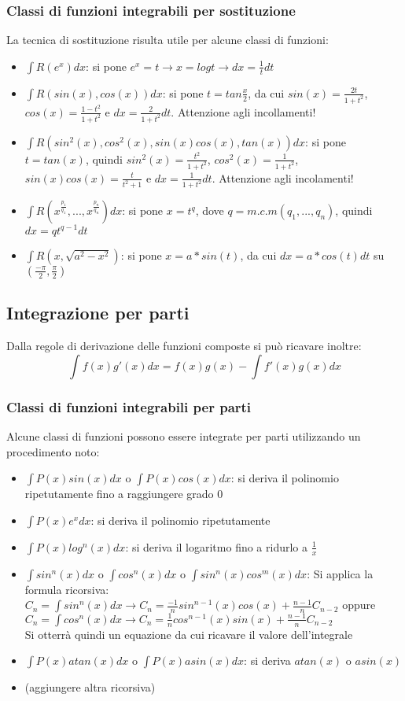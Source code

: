 \documentclass{article}
\begin{document}
\subsubsection{Classi di funzioni integrabili per sostituzione}
La tecnica di sostituzione risulta utile per alcune classi di funzioni:
\begin{itemize}
    \item $\int R(e^x)dx$: si pone $e^x=t\rightarrow x=logt\rightarrow dx=\frac{1}{t}dt$
    \item $\int R(sin(x), cos(x))dx$: si pone $t=tan\frac{x}{2}$, da cui $sin(x)=\frac{2t}{1+t^2}$, $cos(x)=\frac{1-t^2}{1+t^2}$ e $dx=\frac{2}{1+t^2}dt$. Attenzione agli incollamenti!
    \item $\int R(sin^2(x), cos^2(x), sin(x)cos(x), tan(x))dx$: si pone $t=tan(x)$, quindi $sin^2(x)=\frac{t^2}{1+t^2}$, $cos^2(x)=\frac{1}{1+t^2}$, $sin(x)cos(x)=\frac{t}{t^2+1}$ e $dx=\frac{1}{1+t^2}dt$. Attenzione agli incolamenti!
    \item $\int R(x^{\frac{p_1}{q_1}},...,x^{\frac{p_n}{q_n}})dx$: si pone $x=t^q$, dove $q=m.c.m(q_1,...,q_n)$, quindi $dx=qt^{q-1}dt$
    \item $\int R(x, \sqrt{a^2-x^2})$: si pone $x=a*sin(t)$, da cui $dx=a*cos(t)dt$ su $(\frac{-\pi}{2}, \frac{\pi}{2})$
\end{itemize}

\subsection{Integrazione per parti}
Dalla regole di derivazione delle funzioni composte si può ricavare inoltre:
$$\int f(x)g'(x)dx=f(x)g(x)-\int f'(x)g(x)dx$$

\subsubsection{Classi di funzioni integrabili per parti}
Alcune classi di funzioni possono essere integrate per parti utilizzando un procedimento noto:
\begin{itemize}
    \item $\int P(x)sin(x)dx$ o $\int P(x)cos(x)dx$: si deriva il polinomio ripetutamente fino a raggiungere grado 0
    \item $\int P(x)e^xdx$: si deriva il polinomio ripetutamente
    \item $\int P(x)log^n(x)dx$: si deriva il logaritmo fino a ridurlo a $\frac{1}{x}$
    \item $\int sin^n(x)dx$ o $\int cos^n(x)dx$ o $\int sin^n(x)cos^m(x)dx$: Si applica la formula ricorsiva:\\ $C_n=\int sin^n(x)dx\rightarrow C_n=\frac{-1}{n}sin^{n-1}(x)cos(x)+\frac{n-1}{n}C_{n-2}$ oppure\\ $C_n=\int cos^n(x)dx\rightarrow C_n=\frac{1}{n}cos^{n-1}(x)sin(x)+\frac{n-1}{n}C_{n-2}$\\
    Si otterrà quindi un equazione da cui ricavare il valore dell'integrale
    \item $\int P(x)atan(x)dx$ o $\int P(x)asin(x)dx$: si deriva $atan(x)$ o $asin(x)$
    \item (aggiungere altra ricorsiva)
\end{itemize}
\end{document}
